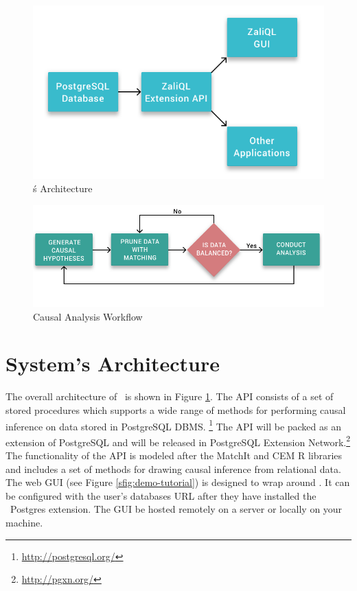 
\begin{figure}
 \includegraphics[scale=0.25]{Figures/System-Overview.png}
 \caption{\GSQLB\'s Architecture}
  \label{fig:arch}
  \vspace{-3mm}
\end{figure}


\begin{figure}
  \includegraphics[scale=0.25]{Figures/Matching-Flowchart.png}
\caption{Causal Analysis Workflow}
\label{fig:flowchart}
\vspace{-0.3cm}
\end{figure}



\section{System's Architecture}

The overall architecture of \GSQL\ is shown in Figure \ref{fig:arch}.
The API consists of a set of stored procedures which supports a wide range of methods for performing causal inference on data stored in PostgreSQL DBMS. \footnote{\url{http://postgresql.org/}}
The API will be packed  as an extension of  PostgreSQL and will be released in
PostgreSQL Extension Network.\footnote{\url{http://pgxn.org/}}
The functionality of the API is modeled after the MatchIt and CEM R libraries \cite{ho2005,iacus2009cem} and includes a set of methods for drawing causal inference
from relational data. The web GUI (see Figure \ref{sfig:demo-tutorial}) is designed to wrap around \GSQL. It can be configured with the user's databases URL after they have installed the \GSQL\ Postgres extension. The  GUI be hosted remotely on a server or locally on your machine. 

